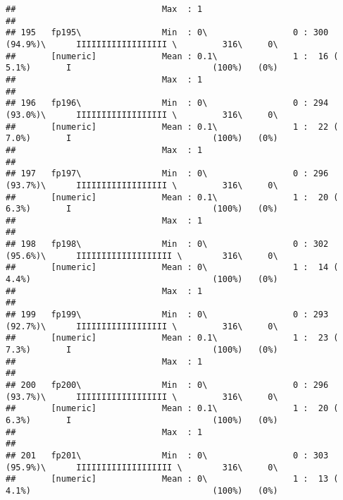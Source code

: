 \documentclass[]{article}
\begin{document}
\begin{verbatim}
##                             Max  : 1                                                                                       
## 
## 195   fp195\                Min  : 0\                 0 : 300 (94.9%)\      IIIIIIIIIIIIIIIIII \         316\     0\       
##       [numeric]             Mean : 0.1\               1 :  16 ( 5.1%)       I                            (100%)   (0%)     
##                             Max  : 1                                                                                       
## 
## 196   fp196\                Min  : 0\                 0 : 294 (93.0%)\      IIIIIIIIIIIIIIIIII \         316\     0\       
##       [numeric]             Mean : 0.1\               1 :  22 ( 7.0%)       I                            (100%)   (0%)     
##                             Max  : 1                                                                                       
## 
## 197   fp197\                Min  : 0\                 0 : 296 (93.7%)\      IIIIIIIIIIIIIIIIII \         316\     0\       
##       [numeric]             Mean : 0.1\               1 :  20 ( 6.3%)       I                            (100%)   (0%)     
##                             Max  : 1                                                                                       
## 
## 198   fp198\                Min  : 0\                 0 : 302 (95.6%)\      IIIIIIIIIIIIIIIIIII \        316\     0\       
##       [numeric]             Mean : 0\                 1 :  14 ( 4.4%)                                    (100%)   (0%)     
##                             Max  : 1                                                                                       
## 
## 199   fp199\                Min  : 0\                 0 : 293 (92.7%)\      IIIIIIIIIIIIIIIIII \         316\     0\       
##       [numeric]             Mean : 0.1\               1 :  23 ( 7.3%)       I                            (100%)   (0%)     
##                             Max  : 1                                                                                       
## 
## 200   fp200\                Min  : 0\                 0 : 296 (93.7%)\      IIIIIIIIIIIIIIIIII \         316\     0\       
##       [numeric]             Mean : 0.1\               1 :  20 ( 6.3%)       I                            (100%)   (0%)     
##                             Max  : 1                                                                                       
## 
## 201   fp201\                Min  : 0\                 0 : 303 (95.9%)\      IIIIIIIIIIIIIIIIIII \        316\     0\       
##       [numeric]             Mean : 0\                 1 :  13 ( 4.1%)                                    (100%)   (0%)     

\end{verbatim}
\end{document}
